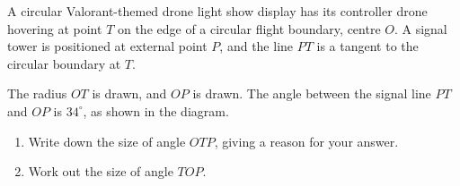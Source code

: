 \begin{question}
\noindent A circular Valorant-themed drone light show display has its controller drone hovering at point $T$ on the edge of a circular flight boundary, centre $O$. A signal tower is positioned at external point $P$, and the line $PT$ is a tangent to the circular boundary at $T$.

The radius $OT$ is drawn, and $OP$ is drawn. The angle between the signal line $PT$ and $OP$ is $34^\circ$, as shown in the diagram.

\begin{center}
\end{center}

\begin{enumerate}
    \item[(a)] Write down the size of angle $OTP$, giving a reason for your answer.

    \vspace{2.5cm}

    \item[(b)] Work out the size of angle $TOP$.

    \vspace{3cm}
\end{enumerate}
\end{question}
